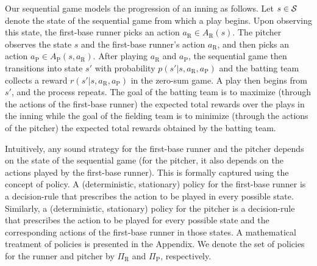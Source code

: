 \documentclass[11pt]{article}
\begin{document}
    Our sequential game models the progression of an inning as follows. Let $s \in {\cal S}$ denote the state of the sequential game from which a play begins. Upon observing this state, the first-base runner picks an action $a_\text{R} \in A_\text{R}(s)$. The pitcher observes the state $s$ and the first-base runner's action $a_\text{R}$, and then picks an action $a_\text{P} \in A_\text{P}(s,a_\text{R})$. After playing $a_\text{R}$ and $a_\text{P}$, the sequential game then transitions into state $s'$ with probability $p(s'|s,a_\text{R},a_\text{P})$ and the batting team collects a reward $r(s'|s,a_\text{R},a_\text{P})$ in the zero-sum game. A play then begins from $s'$, and the process repeats. The goal of the batting team is to maximize (through the actions of the first-base runner) the expected total rewards over the plays in the inning while the goal of the fielding team is to minimize (through the actions of the pitcher) the expected total rewards obtained by the batting team.

    Intuitively, any sound strategy for the first-base runner and the pitcher depends on the state of the sequential game (for the pitcher, it also depends on the actions played by the first-base runner). This is formally captured using the concept of policy. A (deterministic, stationary) policy for the first-base runner is a decision-rule that prescribes the action to be played in every possible state. Similarly, a (deterministic, stationary) policy for the pitcher is a decision-rule that prescribes the action to be played for every possible state and the corresponding actions of the first-base runner in those states. A mathematical treatment of policies is presented in the Appendix. We denote the set of policies for the runner and pitcher by $\Pi_\text{R}$ and $\Pi_\text{P}$, respectively.
\end{document}
